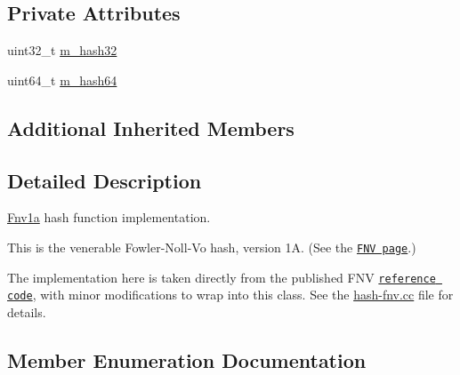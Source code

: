 \subsection*{Private Attributes}
{\bf }\par
\begin{DoxyCompactItemize}
\item 
uint32\+\_\+t \hyperlink{classns3_1_1Hash_1_1Function_1_1Fnv1a_a0de2a098e00e7e9589136863446ee461}{m\+\_\+hash32}
\item 
uint64\+\_\+t \hyperlink{classns3_1_1Hash_1_1Function_1_1Fnv1a_af9ce4f97da33186e95f8c8e30e6c016e}{m\+\_\+hash64}
\end{DoxyCompactItemize}

\subsection*{Additional Inherited Members}


\subsection{Detailed Description}
\hyperlink{classns3_1_1Hash_1_1Function_1_1Fnv1a}{Fnv1a} hash function implementation. 

This is the venerable Fowler-\/\+Noll-\/\+Vo hash, version 1A. (See the \href{http://isthe.com/chongo/tech/comp/fnv/}{\tt F\+NV page}.)

The implementation here is taken directly from the published F\+NV \href{http://isthe.com/chongo/tech/comp/fnv/#FNV-reference-source}{\tt reference code}, with minor modifications to wrap into this class. See the \hyperlink{hash-fnv_8cc}{hash-\/fnv.\+cc} file for details. 

\subsection{Member Enumeration Documentation}
